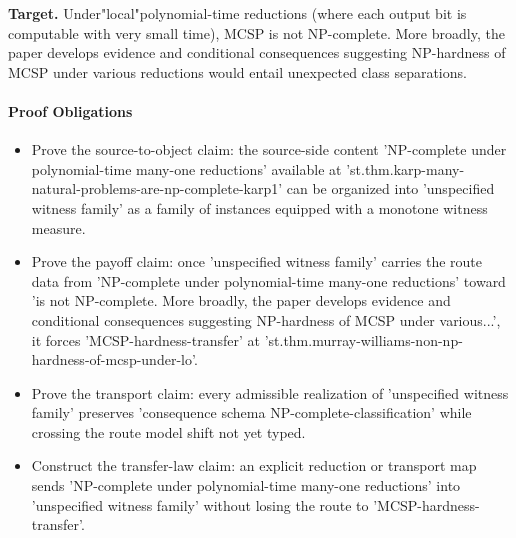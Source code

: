 \documentclass[11pt]{article}
\begin{document}
\textbf{Target.} Under"local"polynomial-time reductions (where each output bit is computable with very small time), MCSP is not NP-complete. More broadly, the paper develops evidence and conditional consequences suggesting NP-hardness of MCSP under various reductions would entail unexpected class separations.

\paragraph{Proof Obligations}
\begin{itemize}[leftmargin=*,itemsep=0.2em]
\item Prove the source-to-object claim: the source-side content 'NP-complete under polynomial-time many-one reductions' available at 'st.thm.karp-many-natural-problems-are-np-complete-karp1' can be organized into 'unspecified witness family' as a family of instances equipped with a monotone witness measure.
\item Prove the payoff claim: once 'unspecified witness family' carries the route data from 'NP-complete under polynomial-time many-one reductions' toward 'is not NP-complete. More broadly, the paper develops evidence and conditional consequences suggesting NP-hardness of MCSP under various...', it forces 'MCSP-hardness-transfer' at 'st.thm.murray-williams-non-np-hardness-of-mcsp-under-lo'.
\item Prove the transport claim: every admissible realization of 'unspecified witness family' preserves 'consequence schema NP-complete-classification' while crossing the route model shift not yet typed.
\item Construct the transfer-law claim: an explicit reduction or transport map sends 'NP-complete under polynomial-time many-one reductions' into 'unspecified witness family' without losing the route to 'MCSP-hardness-transfer'.
\end{itemize}
\end{document}
